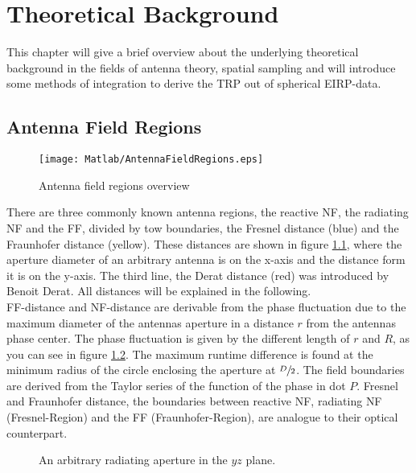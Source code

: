 \chapter{Theoretical Background}

This chapter will give a brief overview about the underlying theoretical background in the fields of antenna theory, spatial sampling and will introduce some methods of integration to derive the \ac{TRP} out of spherical \ac{EIRP}-data.

\section{Antenna Field Regions}

\begin{figure}[H]
\centering
\texttt{[image: Matlab/AntennaFieldRegions.eps]}
\caption{Antenna field regions overview}
\label{fig:antennafieldreg}
\end{figure}

There are three commonly known antenna regions, the reactive \ac{NF}, the radiating \ac{NF} and the \ac{FF}, divided by tow boundaries, the Fresnel distance (blue) and the Fraunhofer distance (yellow). These distances are shown in figure \ref{fig:antennafieldreg}, where the aperture diameter of an arbitrary antenna is on the x-axis and the distance form it is on the y-axis. The third line, the Derat distance (red) was introduced by Benoit Derat. \cite{8393926} All distances will be explained in the following.\\
\ac{FF}-distance and \ac{NF}-distance are derivable from the phase fluctuation due to the maximum diameter of the antennas aperture \cite{7942128} in a distance $r$ from the antennas phase center. The phase fluctuation is given by the different length of $r$ and $R$, as you can see in figure \ref{fig:arbaperturexy}. The maximum runtime difference is found at the minimum radius of the circle enclosing the aperture at $\sfrac{D}{2}$. The field boundaries are derived from the Taylor series of the function of the phase in dot $P$. Fresnel and Fraunhofer distance, the boundaries between reactive \ac{NF}, radiating \ac{NF} (Fresnel-Region) and the \ac{FF} (Fraunhofer-Region), are analogue to their optical counterpart. \cite{7942128} \cite{balanis}

\begin{figure}[H]
\centering
\def\svgwidth{0.6\textwidth}

\caption{An arbitrary radiating aperture in the $yz$ plane. \cite{7942128}}
\label{fig:arbaperturexy}
\end{figure}

